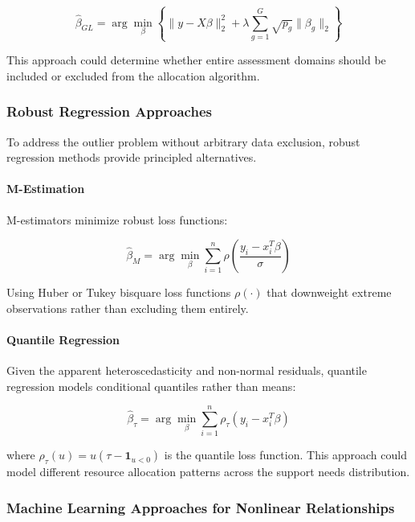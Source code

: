 \begin{equation}
\hat{\beta}_{GL} = \arg\min_{\beta} \left\{ \|y - X\beta\|_2^2 + \lambda\sum_{g=1}^G \sqrt{p_g}\|\beta_g\|_2 \right\}
\end{equation}

This approach could determine whether entire assessment domains should be included or excluded from the allocation algorithm.

\subsubsection{Robust Regression Approaches}

To address the outlier problem without arbitrary data exclusion, robust regression methods provide principled alternatives.

\paragraph{M-Estimation}
M-estimators minimize robust loss functions:

\begin{equation}
\hat{\beta}_{M} = \arg\min_{\beta} \sum_{i=1}^n \rho\left(\frac{y_i - x_i^T\beta}{\sigma}\right)
\end{equation}

Using Huber or Tukey bisquare loss functions $\rho(\cdot)$ that downweight extreme observations rather than excluding them entirely.

\paragraph{Quantile Regression}
Given the apparent heteroscedasticity and non-normal residuals, quantile regression models conditional quantiles rather than means:

\begin{equation}
\hat{\beta}_\tau = \arg\min_{\beta} \sum_{i=1}^n \rho_\tau(y_i - x_i^T\beta)
\end{equation}

where $\rho_\tau(u) = u(\tau - \mathbf{1}_{u<0})$ is the quantile loss function. This approach could model different resource allocation patterns across the support needs distribution.

\subsubsection{Machine Learning Approaches for Nonlinear Relationships}

